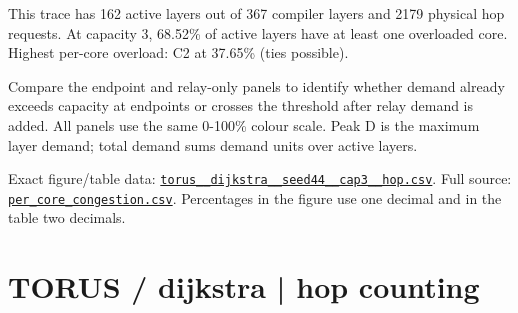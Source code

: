 \documentclass[10pt,a4paper]{article}
\begin{document}
This trace has 162 active layers out of 367 compiler layers and 2179 physical hop requests. At capacity 3, 68.52\% of active layers have at least one overloaded core. Highest per-core overload: C2 at 37.65\% (ties possible).\par
Compare the endpoint and relay-only panels to identify whether demand already exceeds capacity at endpoints or crosses the threshold after relay demand is added. All panels use the same 0-100\% colour scale. Peak D is the maximum layer demand; total demand sums demand units over active layers.\par
Exact figure/table data: \href{\detokenize{file:///home/dhruv-pansuriya/Documents/BTP/Compiler-Driven-ACE/output/pdf/qaoa_methods_congestion/tables/torus__dijkstra__seed44__cap3__hop.csv}}{\nolinkurl{torus__dijkstra__seed44__cap3__hop.csv}}. Full source: \href{\detokenize{file:///home/dhruv-pansuriya/Documents/BTP/Compiler-Driven-ACE/results/qaoa_2seed_2026-10-26/congestion/per_core_congestion.csv}}{\nolinkurl{per_core_congestion.csv}}. Percentages in the figure use one decimal and in the table two decimals.\par
\clearpage
\section*{TORUS / dijkstra | hop counting}
\end{document}
